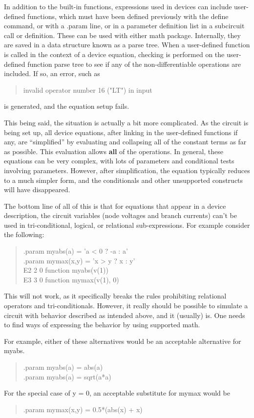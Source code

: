 In addition to the built-in functions, expressions used in devices can
include user-defined functions, which must have been defined
previously with the {\cb define} command, or with a {\vt .param} line,
or in a parameter definition list in a subcircuit call or definition. 
These can be used with either math package.  Internally, they are
saved in a data structure known as a parse tree.  When a user-defined
function is called in the context of a device equation, checking is
performed on the user-defined function parse tree to see if any of the
non-differentiable operations are included.  If so, an error, such as
\begin{quote}
\vt invalid operator number 16 ("LT") in input
\end{quote}
is generated, and the equation setup fails.

This being said, the situation is actually a bit more complicated.  As
the circuit is being set up, all device equations, after linking in
the user-defined functions if any, are ``simplified'' by evaluating
and collapsing all of the constant terms as far as possible.  This
evaluation allows {\bf all} of the operations.  In general, these
equations can be very complex, with lots of parameters and conditional
tests involving parameters.  However, after simplification, the
equation typically reduces to a much simpler form, and the
conditionals and other unsupported constructs will have disappeared.

The bottom line of all of this is that for equations that appear in a
device description, the circuit variables (node voltages and branch
currents) can't be used in tri-conditional, logical, or relational
sub-expressions.  For example consider the following:

\begin{quote}\vt
.param myabs(a) = 'a < 0 ? -a : a'\\
.param mymax(x,y) = 'x > y ? x : y'\\
E2 2 0 function myabs(v(1))\\
E3 3 0 function mymax(v(1), 0)
\end{quote}

This will not work, as it specifically breaks the rules prohibiting
relational operators and tri-conditionals.  However, it really should
be possible to simulate a circuit with behavior described as intended
above, and it (usually) is.  One needs to find ways of expressing the
behavior by using supported math.

For example, either of these alternatives would be an acceptable
alternative for {\vt myabs}.
\begin{quote}\vt
.param myabs(a) = abs(a)\\
.param myabs(a) = sqrt(a*a)
\end{quote}
For the special case of {\vt y = 0}, an acceptable substitute
for {\vt mymax} would be
\begin{quote}\vt
.param mymax(x,y) = 0.5*(abs(x) + x)
\end{quote}

